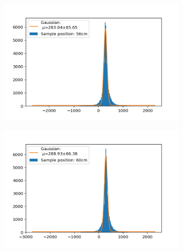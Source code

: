 \documentclass[]{article}
\begin{document}
\begin{figure}[H]
\centering
\medskip
\begin{subfigure}{0.48\textwidth}
\includegraphics[width=\linewidth]{Plots/Pos/56cm.png}
\end{subfigure}
\begin{subfigure}[c]{0.48\linewidth}
\includegraphics[width=\linewidth]{Plots/Pos/60cm.png}
\end{subfigure}


\end{figure}
\end{document}

